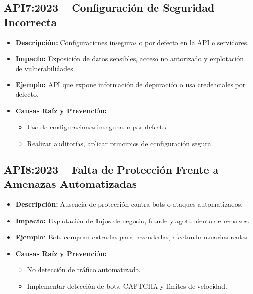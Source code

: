 \documentclass[a4paper,12pt]{article}
\begin{document}
\subsection{API7:2023 – Configuración de Seguridad Incorrecta}
\begin{itemize}
    \item \textbf{Descripción:} Configuraciones inseguras o por defecto en la API o servidores.
    \item \textbf{Impacto:} Exposición de datos sensibles, acceso no autorizado y explotación de vulnerabilidades.
    \item \textbf{Ejemplo:} API que expone información de depuración o usa credenciales por defecto.
    \item \textbf{Causas Raíz y Prevención:}
    \begin{itemize}
        \item Uso de configuraciones inseguras o por defecto.
        \item Realizar auditorías, aplicar principios de configuración segura.
    \end{itemize}
\end{itemize}

\subsection{API8:2023 – Falta de Protección Frente a Amenazas Automatizadas}
\begin{itemize}
    \item \textbf{Descripción:} Ausencia de protección contra bots o ataques automatizados.
    \item \textbf{Impacto:} Explotación de flujos de negocio, fraude y agotamiento de recursos.
    \item \textbf{Ejemplo:} Bots compran entradas para revenderlas, afectando usuarios reales.
    \item \textbf{Causas Raíz y Prevención:}
    \begin{itemize}
        \item No detección de tráfico automatizado.
        \item Implementar detección de bots, CAPTCHA y límites de velocidad.
    \end{itemize}
\end{itemize}
\end{document}
